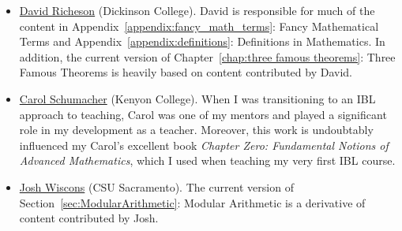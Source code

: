 \begin{itemize}
\item \href{http://users.dickinson.edu/~richesod/}{David Richeson} (Dickinson College). David is responsible for much of the content in Appendix~\ref{appendix:fancy_math_terms}: Fancy Mathematical Terms and Appendix~\ref{appendix:definitions}: Definitions in Mathematics. In addition, the current version of Chapter~\ref{chap:three famous theorems}: Three Famous Theorems is heavily based on content contributed by David.
\item \href{http://www2.kenyon.edu/Depts/Math/schumacherc/public_html/}{Carol Schumacher} (Kenyon College). When I was transitioning to an IBL approach to teaching, Carol was one of my mentors and played a significant role in my development as a teacher.  Moreover, this work is undoubtably influenced my Carol's excellent book \emph{Chapter Zero: Fundamental Notions of Advanced Mathematics}, which I used when teaching my very first IBL course.
\item \href{http://webpages.csus.edu/wiscons/}{Josh Wiscons} (CSU Sacramento). The current version of Section~\ref{sec:ModularArithmetic}: Modular Arithmetic is a derivative of content contributed by Josh.
\end{itemize}
